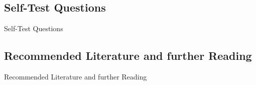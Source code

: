 \subsection{Self-Test Questions}

\begin{frame}{Self-Test Questions}{}

\end{frame}


\subsection{Recommended Literature and further Reading}

\begin{frame}{Recommended Literature and further Reading}{}
	\footnotesize
	\begin{thebibliography}{2}

	\end{thebibliography}
\end{frame}


\makethanks


